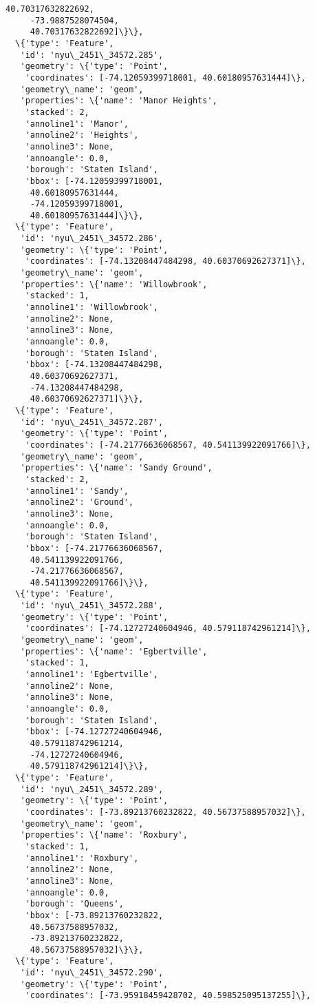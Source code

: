 \documentclass[11pt]{article}
\begin{document}
\begin{tcolorbox}[breakable, size=fbox, boxrule=.5pt, pad at break*=1mm, opacityfill=0]
\begin{Verbatim}[commandchars=\\\{\}]
     40.70317632822692,
     -73.9887528074504,
     40.70317632822692]\}\},
  \{'type': 'Feature',
   'id': 'nyu\_2451\_34572.285',
   'geometry': \{'type': 'Point',
    'coordinates': [-74.12059399718001, 40.60180957631444]\},
   'geometry\_name': 'geom',
   'properties': \{'name': 'Manor Heights',
    'stacked': 2,
    'annoline1': 'Manor',
    'annoline2': 'Heights',
    'annoline3': None,
    'annoangle': 0.0,
    'borough': 'Staten Island',
    'bbox': [-74.12059399718001,
     40.60180957631444,
     -74.12059399718001,
     40.60180957631444]\}\},
  \{'type': 'Feature',
   'id': 'nyu\_2451\_34572.286',
   'geometry': \{'type': 'Point',
    'coordinates': [-74.13208447484298, 40.60370692627371]\},
   'geometry\_name': 'geom',
   'properties': \{'name': 'Willowbrook',
    'stacked': 1,
    'annoline1': 'Willowbrook',
    'annoline2': None,
    'annoline3': None,
    'annoangle': 0.0,
    'borough': 'Staten Island',
    'bbox': [-74.13208447484298,
     40.60370692627371,
     -74.13208447484298,
     40.60370692627371]\}\},
  \{'type': 'Feature',
   'id': 'nyu\_2451\_34572.287',
   'geometry': \{'type': 'Point',
    'coordinates': [-74.21776636068567, 40.541139922091766]\},
   'geometry\_name': 'geom',
   'properties': \{'name': 'Sandy Ground',
    'stacked': 2,
    'annoline1': 'Sandy',
    'annoline2': 'Ground',
    'annoline3': None,
    'annoangle': 0.0,
    'borough': 'Staten Island',
    'bbox': [-74.21776636068567,
     40.541139922091766,
     -74.21776636068567,
     40.541139922091766]\}\},
  \{'type': 'Feature',
   'id': 'nyu\_2451\_34572.288',
   'geometry': \{'type': 'Point',
    'coordinates': [-74.12727240604946, 40.579118742961214]\},
   'geometry\_name': 'geom',
   'properties': \{'name': 'Egbertville',
    'stacked': 1,
    'annoline1': 'Egbertville',
    'annoline2': None,
    'annoline3': None,
    'annoangle': 0.0,
    'borough': 'Staten Island',
    'bbox': [-74.12727240604946,
     40.579118742961214,
     -74.12727240604946,
     40.579118742961214]\}\},
  \{'type': 'Feature',
   'id': 'nyu\_2451\_34572.289',
   'geometry': \{'type': 'Point',
    'coordinates': [-73.89213760232822, 40.56737588957032]\},
   'geometry\_name': 'geom',
   'properties': \{'name': 'Roxbury',
    'stacked': 1,
    'annoline1': 'Roxbury',
    'annoline2': None,
    'annoline3': None,
    'annoangle': 0.0,
    'borough': 'Queens',
    'bbox': [-73.89213760232822,
     40.56737588957032,
     -73.89213760232822,
     40.56737588957032]\}\},
  \{'type': 'Feature',
   'id': 'nyu\_2451\_34572.290',
   'geometry': \{'type': 'Point',
    'coordinates': [-73.95918459428702, 40.598525095137255]\},

\end{Verbatim}
\end{tcolorbox}
\end{document}
